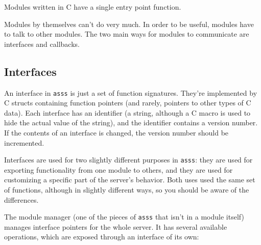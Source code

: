 \documentclass{article}
\newcommand{\asss}{\texttt{asss}}
\begin{document}
Modules written in C have a single entry point function.

Modules by themselves can't do very much. In order to be useful, modules
have to talk to other modules. The two main ways for modules to
communicate are interfaces and callbacks.

\subsection{Interfaces}

An interface in \asss{} is just a set of function signatures. They're
implemented by C structs containing function pointers (and rarely,
pointers to other types of C data). Each interface has an identifier (a
string, although a C macro is used to hide the actual value of the
string), and the identifier contains a version number. If the contents
of an interface is changed, the version number should be incremented.

Interfaces are used for two slightly different purposes in \asss{}: they
are used for exporting functionality from one module to others, and they
are used for customizing a specific part of the server's behavior. Both
uses used the same set of functions, although in slightly different
ways, so you should be aware of the differences.

The module manager (one of the pieces of \asss{} that isn't in a module
itself) manages interface pointers for the whole server. It has several
available operations, which are exposed through an interface of its own:
\end{document}
